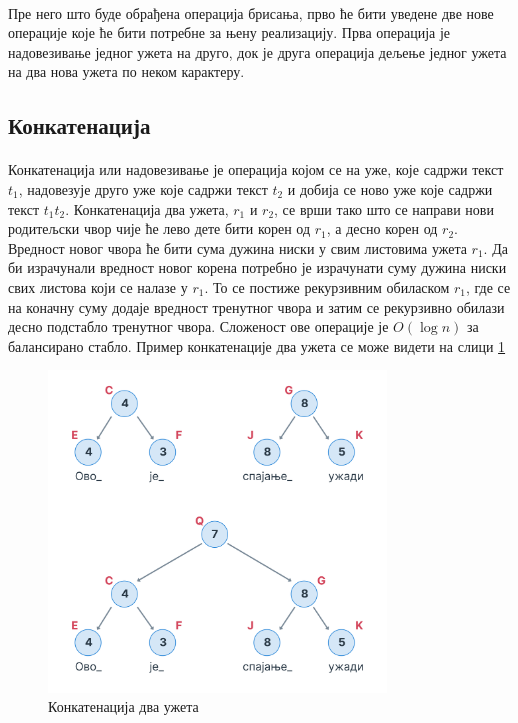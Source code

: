 \documentclass[12pt,oneside]{memoir}
\begin{document}
\paragraph{}
Пре него што буде обрађена операција брисања, прво ће бити уведене две нове операције које ће
бити потребне за њену реализацију. Прва операција је надовезивање једног ужета на друго,
док је друга операција дељење једног ужета на два нова ужета по неком карактеру.


\subsection{Конкатенација}
\paragraph{}
Конкатенација или надовезивање је операција којом се на уже, које садржи текст \(t_1\), 
надовезује друго уже које садржи текст \(t_2\) и добија се ново уже које садржи текст \(t_1t_2\).
Конкатенација два ужета, \(r_1\) и \(r_2\), се врши тако што се направи нови родитељски чвор
чије ће лево дете бити корен од \(r_1\), а десно корен од  \(r_2\). Вредност новог чвора ће
бити сума дужина ниски у свим листовима ужета \(r_1\). Да би израчунали вредност новог корена
потребно је израчунати суму дужина ниски свих листова који се налазе у \(r_1\). То се постиже
рекурзивним обиласком \(r_1\), где се на коначну суму додаје вредност тренутног чвора и
затим се рекурзивно обилази десно подстабло тренутног чвора. Сложеност ове 
операције је \(O(\log{}n)\) за балансирано стабло. Пример конкатенације два 
ужета се може видети на слици \ref{fig:rope_concat}

\begin{figure}
  \centering
  \includegraphics[width=0.8\textwidth]{images/rope_concat_1.png}
  \caption{Конкатенација два ужета}
  \label{fig:rope_concat}
\end{figure}
\end{document}
